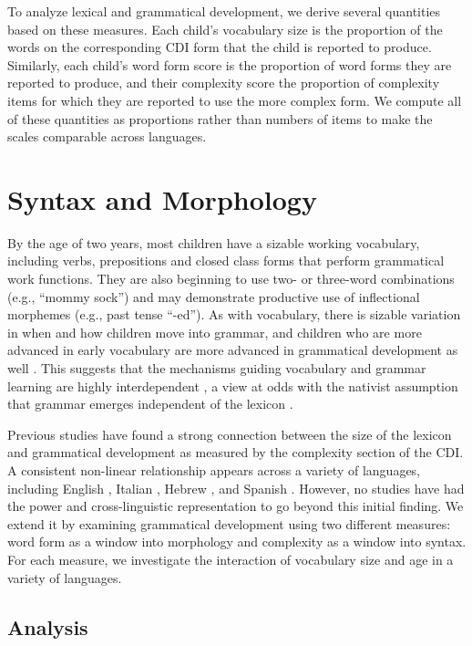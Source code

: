\documentclass[10pt,letterpaper]{article}
\begin{document}
To analyze lexical and grammatical development, we derive several quantities based on these measures. Each child's vocabulary size is the proportion of the words on the corresponding CDI form that the child is reported to produce. Similarly, each child's word form score is the proportion of word forms they are reported to produce, and their complexity score the proportion of complexity items for which they are reported to use the more complex form. We compute all of these quantities as proportions rather than numbers of items to make the scales comparable across languages.

\section{Syntax and Morphology}

By the age of two years, most children have a sizable working vocabulary, including verbs, prepositions and closed class forms that perform grammatical work functions. They are also beginning to use two- or three-word combinations (e.g., ``mommy sock'') and may demonstrate productive use of inflectional morphemes (e.g., past tense ``-ed''). As with vocabulary, there is sizable variation in when and how children move into grammar, and children who are more advanced in early vocabulary are more advanced in grammatical development as well \cite{bates1999}. This suggests that the mechanisms guiding vocabulary and grammar learning are highly interdependent \cite{tomasello2003,bresnan2001}, a view at odds with the nativist assumption that grammar emerges independent of the lexicon \cite{chomsky1981}.

Previous studies have found a strong connection between the size of the lexicon and grammatical development as measured by the complexity section of the CDI. A consistent non-linear relationship appears across a variety of languages, including English \cite{bates1994,fenson1994}, Italian \cite{caselli1999}, Hebrew \cite{maital2000}, and Spanish \cite{jackson-maldonado2003}. However, no studies have had the power and cross-linguistic representation to go beyond this initial finding. We extend it by examining grammatical development using two different measures: word form as a window into morphology and complexity as a window into syntax. For each measure, we investigate the interaction of vocabulary size and age in a variety of languages.

\subsection{Analysis}
\end{document}
